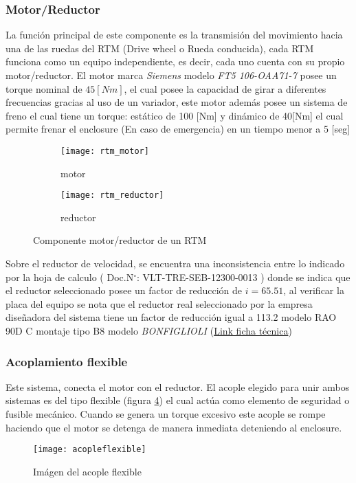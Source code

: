                 \subsubsection{Motor/Reductor}
                    La función principal de este componente es la transmisión del movimiento hacia una de las ruedas del RTM (Drive wheel o Rueda conducida), cada RTM funciona como un equipo independiente, es decir, cada uno cuenta con su propio motor/reductor. El motor marca \textit{Siemens} modelo \textit{FT5 106-OAA71-7} posee un torque nominal de $45 [Nm]$, el cual posee la capacidad de girar a diferentes frecuencias gracias al uso de un variador, este motor además posee un sistema de freno el cual tiene un torque: estático de 100 [Nm] y dinámico de 40[Nm] el cual permite frenar el enclosure (En caso de emergencia) en un tiempo menor a 5 [seg]
                    \begin{figure}[H]
        				\centering
        				\begin{subfigure}[b]{0.45\textwidth}
        					\texttt{[image: rtm\_motor]}
        					\caption{motor}
        					\label{fig:rtm_motor}
        				\end{subfigure}			    
        			    \begin{subfigure}[b]{0.45\textwidth}
        			    	\texttt{[image: rtm\_reductor]}
        			    	\caption{reductor}
        			    	\label{fig:rtm_reductor}
        			    \end{subfigure}
        		        \caption{Componente motor/reductor de un RTM}
        		        \label{fig:rtm_motor_reductor}
                    \end{figure}
                    Sobre el reductor de velocidad, se encuentra una inconsistencia entre lo indicado por la hoja de calculo ( Doc.N$^{\circ}$: VLT-TRE-SEB-12300-0013 ) donde se indica que el reductor seleccionado posee un factor de reducción de $i=65.51$, al verificar la placa del equipo se nota que el reductor real seleccionado por la empresa diseñadora del sistema tiene un factor de reducción igual a 113.2 modelo RAO 90D C montaje tipo B8 modelo \textit{BONFIGLIOLI} (\href{http://www.brtspareparts.com/media/filer_public/be/4e/be4ee0b1-ac1a-4d38-9035-7b467686c8f4/br_strip_rao_1164_r0.pdf}{Link ficha técnica})
                \subsubsection{Acoplamiento flexible}
                    Este sistema, conecta el motor con el reductor. El acople elegido para unir ambos sistemas es del tipo flexible (figura \ref{fig:acople}) el cual actúa como elemento de seguridad o fusible mecánico. Cuando se genera un torque excesivo este acople se rompe haciendo que el motor se detenga de manera inmediata deteniendo al enclosure.
                    \begin{figure}
                        \centering
                        \texttt{[image: acopleflexible]}
                        \caption{Imágen del acople flexible}
                        \label{fig:acople}
                    \end{figure}
